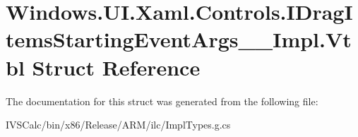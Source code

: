 \hypertarget{struct_windows_1_1_u_i_1_1_xaml_1_1_controls_1_1_i_drag_items_starting_event_args_____impl_1_1_vtbl}{}\section{Windows.\+U\+I.\+Xaml.\+Controls.\+I\+Drag\+Items\+Starting\+Event\+Args\+\_\+\+\_\+\+Impl.\+Vtbl Struct Reference}
\label{struct_windows_1_1_u_i_1_1_xaml_1_1_controls_1_1_i_drag_items_starting_event_args_____impl_1_1_vtbl}


The documentation for this struct was generated from the following file\+:\begin{DoxyCompactItemize}
\item 
I\+V\+S\+Calc/bin/x86/\+Release/\+A\+R\+M/ilc/Impl\+Types.\+g.\+cs\end{DoxyCompactItemize}
